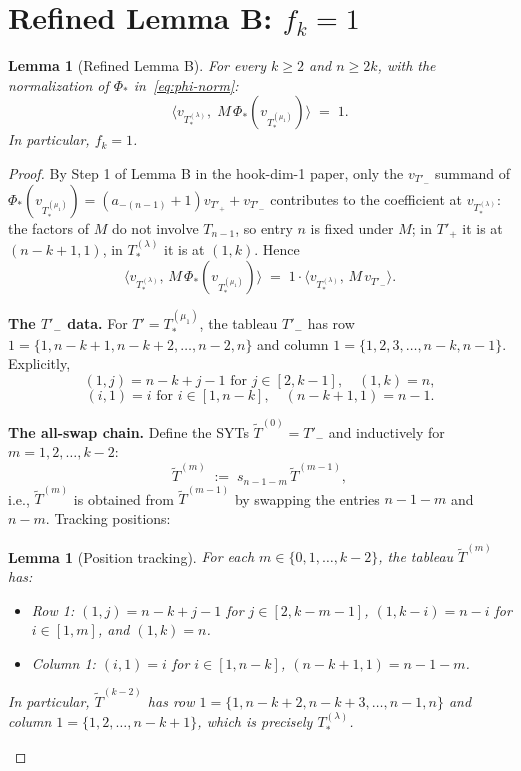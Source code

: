 \documentclass[11pt]{article}
\newtheorem{lemma}[theorem]{Lemma}
\theoremstyle{definition}
\begin{document}
\section{Refined Lemma B: $f_k = 1$}\label{sec:lemB}

\begin{lemma}[Refined Lemma B]\label{lem:fk}
For every $k \ge 2$ and $n \ge 2k$, with the normalization of
$\Phi_*$ in~\eqref{eq:phi-norm}:
\[
   \langle v_{T_{*}^{(\lambda)}},\; M\,\Phi_*(v_{T_{*}^{(\mu_1)}})\rangle
   \;=\; 1.
\]
In particular, $f_k = 1$.
\end{lemma}

\begin{proof}
By Step 1 of Lemma B in the hook-dim-1 paper, only the $v_{T'_-}$
summand of $\Phi_*(v_{T_{*}^{(\mu_1)}}) = (a_{-(n-1)}+1) v_{T'_+} +
v_{T'_-}$ contributes to the coefficient at $v_{T_{*}^{(\lambda)}}$:
the factors of $M$ do not involve $T_{n-1}$, so entry $n$ is fixed under
$M$; in $T'_+$ it is at $(n-k+1, 1)$, in $T_{*}^{(\lambda)}$ it is at
$(1, k)$.  Hence
\[
   \langle v_{T_{*}^{(\lambda)}},\, M\,\Phi_*(v_{T_{*}^{(\mu_1)}})\rangle
   \;=\; 1 \cdot \langle v_{T_{*}^{(\lambda)}},\, M\, v_{T'_-}\rangle.
\]

\textbf{The $T'_-$ data.}  For $T' = T_{*}^{(\mu_1)}$, the tableau
$T'_-$ has row $1 = \{1, n-k+1, n-k+2, \ldots, n-2, n\}$ and column
$1 = \{1, 2, 3, \ldots, n-k, n-1\}$.  Explicitly,
\[
   (1, j) = n-k+j-1 \text{ for } j \in [2, k-1], \quad (1, k) = n,
\]
\[
   (i, 1) = i \text{ for } i \in [1, n-k], \quad (n-k+1, 1) = n-1.
\]

\textbf{The all-swap chain.}  Define the SYTs
$\widetilde{T}^{(0)} = T'_-$ and inductively for $m = 1, 2, \ldots, k-2$:
\[
   \widetilde{T}^{(m)} \;:=\; s_{n-1-m}\, \widetilde{T}^{(m-1)},
\]
i.e., $\widetilde{T}^{(m)}$ is obtained from $\widetilde{T}^{(m-1)}$ by
swapping the entries $n-1-m$ and $n-m$.  Tracking positions:

\begin{lemma}[Position tracking]\label{lem:positions}
For each $m \in \{0, 1, \ldots, k-2\}$, the tableau $\widetilde{T}^{(m)}$
has:
\begin{itemize}[leftmargin=2em,topsep=0.2em,itemsep=0.1em]
\item Row 1: $(1, j) = n-k+j-1$ for $j \in [2, k-m-1]$,
   $(1, k-i) = n-i$ for $i \in [1, m]$, and $(1, k) = n$.
\item Column 1: $(i, 1) = i$ for $i \in [1, n-k]$,
   $(n-k+1, 1) = n-1-m$.
\end{itemize}
In particular, $\widetilde{T}^{(k-2)}$ has row $1 = \{1, n-k+2,
n-k+3, \ldots, n-1, n\}$ and column $1 = \{1, 2, \ldots, n-k+1\}$,
which is precisely $T_{*}^{(\lambda)}$.
\end{lemma}


\end{proof}
\end{document}
